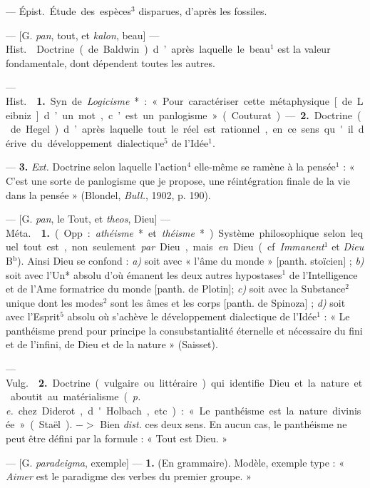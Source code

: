 
	\begin{itemize}[leftmargin=1cm, label=, itemsep=1pt]

 — \si{Épist.} Étude des
espèces$^3$ disparues, d'après les fossiles.

 — [G. {\it pan}, tout, et {\it kalon}, beau] — \si{Hist.}
 Doctrine (de Baldwin) d’après laquelle le beau$^1$ est la
valeur fondamentale, dont dépendent toutes les autres.

 — \si{Hist.}  {\bf 1.} Syn. de
{\it Logicisme}* : « Pour caractériser cette métaphysique [de Leibniz] d’un
mot, c’est un panlogisme » (Couturat). —  {\bf 2.} Doctrine (de Hegel)
d’après laquelle tout le réel est rationnel, en ce sens qu'il dérive du
développement dialectique$^5$ de l’Idée$^1$.

— {\bf 3.} {\it Ext.}  Doctrine selon laquelle l’action$^4$
elle-même se ramène à la pensée$^1$ : « C’est une sorte de panlogisme que je
propose, une réintégration finale de la vie dans la pensée » (Blondel, {\it
Bull.}, 1902, p. 190).

 — [G. {\it pan}, le Tout, et {\it theos}, Dieu] — \si{Méta.}
 {\bf 1.} (Opp. : {\it athéisme}* et {\it théisme}*).
Système philosophique selon lequel tout est, non seulement {\it par} Dieu,
mais {\it en} Dieu (cf. {\it Immanent}$^1$ et {\it Dieu} B$^\text{b}$). Ainsi
Dieu se confond : {\it a)} soit avec « l'âme du monde » [panth. stoïcien] ;
{\it b)} soit avec l’Un* absolu d’où émanent les
deux autres hypostases$^1$ de l’Intelligence et de l’Ame formatrice du monde
[panth. de Plotin]; {\it c)} soit avec la Substance$^2$ unique dont les
modes$^2$ sont les âmes et les corps [panth. de Spinoza] ; {\it d)} soit avec
l'Esprit$^5$ absolu où s'achève le développement dialectique de l’Idée$^1$ :
« Le panthéisme prend pour principe la consubstantialité éternelle et
nécessaire du fini et de l'infini, de Dieu et de la nature » (Saisset).

— \si{Vulg.}  {\bf 2.} Doctrine (vulgaire ou littéraire) qui
identifie Dieu et la nature et aboutit au matérialisme ({\it p. e.} chez
Diderot, d'Holbach, etc.) : « Le panthéisme est la nature divinisée
» (Staël). $->$ Bien {\it dist.} ces deux sens. En aucun cas, le panthéisme
ne peut être défini par la formule : « Tout est Dieu. »

 — [G. {\it paradeigma}, exemple] — {\bf 1.} (En grammaire).
Modèle, exemple type : « {\it Aimer} est le paradigme des verbes du premier
groupe. »


\end{itemize}
